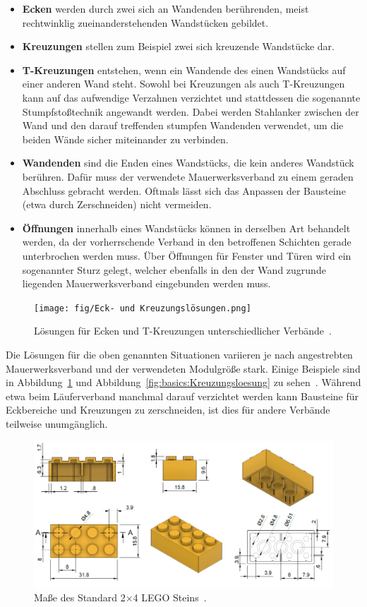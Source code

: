 \begin{itemize}
  \item \textbf{Ecken} werden durch zwei sich an Wandenden berührenden, meist rechtwinklig zueinanderstehenden Wandstücken gebildet.
  \item \textbf{Kreuzungen} stellen zum Beispiel zwei sich kreuzende Wandstücke dar.
  \item \textbf{T-Kreuzungen} entstehen, wenn ein Wandende des einen Wandstücks auf einer anderen Wand steht.
  Sowohl bei Kreuzungen als auch T-Kreuzungen kann auf das aufwendige Verzahnen verzichtet und stattdessen die sogenannte Stumpfstoßtechnik angewandt werden.
  Dabei werden Stahlanker zwischen der Wand und den darauf treffenden \glqq{}stumpfen\grqq{} Wandenden verwendet, um die beiden Wände sicher miteinander zu verbinden.
  \item \textbf{Wandenden} sind die \glqq{}Enden\grqq{} eines Wandstücks, die kein anderes Wandstück berühren.
  Dafür muss der verwendete Mauerwerksverband zu einem geraden Abschluss gebracht werden.
  Oftmals lässt sich das Anpassen der Bausteine (etwa durch Zerschneiden) nicht vermeiden.
  \item \textbf{Öffnungen} innerhalb eines Wandstücks können in derselben Art behandelt werden, da der vorherrschende Verband in den betroffenen Schichten gerade unterbrochen werden muss.
  Über Öffnungen für Fenster und Türen wird ein sogenannter Sturz gelegt, welcher ebenfalls in den der Wand zugrunde liegenden Mauerwerksverband eingebunden werden muss.  
\end{itemize}

\begin{figure}[ht]
  \centering
  \texttt{[image: fig/Eck- und Kreuzungslösungen.png]}
  \caption{Lösungen für Ecken und T-Kreuzungen unterschiedlicher Verbände~\cite{Moro2021}.}\label{fig:basics:mauerwerk_eckloesung}
\end{figure}
Die Lösungen für die oben genannten Situationen variieren je nach angestrebten Mauerwerksverband und der verwendeten Modulgröße stark.
Einige Beispiele sind in Abbildung~\ref{fig:basics:mauerwerk_eckloesung} und Abbildung~\ref{fig:basics:Kreuzungsloesung} zu sehen~\cite{Moro2021}\cite{MaurerfibelKreuzungen:online}.
Während etwa beim Läuferverband manchmal darauf verzichtet werden kann Bausteine für Eckbereiche und Kreuzungen zu zerschneiden, ist dies für andere Verbände teilweise unumgänglich. 

\begin{figure}[hb]
  \centering
  \includegraphics[width=0.85\columnwidth]{fig/LEGO 2mal4 Brick horizontal.png}
  \caption{Maße des Standard 2$\times$4 LEGO Steins~\cite{LEGOBric2:online}.}\label{fig:basics:Lego 2x4 Brick}
\end{figure}
